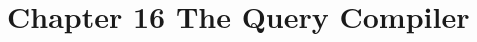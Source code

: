 \documentclass[../../main.tex]{subfiles}
\begin{document}
\section{Chapter 16 The Query Compiler}



\end{document}
